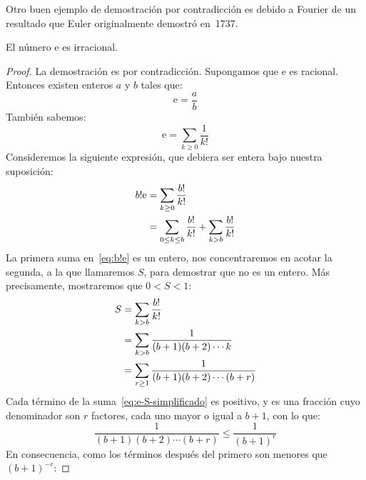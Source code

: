   Otro buen ejemplo de demostración por contradicción
  es debido a Fourier%
  de un resultado que
  Euler originalmente demostró en~1737.%
  \begin{theorem}
    \label{theo:e-irrational}
    El número \(\mathrm{e}\) es irracional.
  \end{theorem}
  \begin{proof}
    La demostración es por contradicción.%
    Supongamos que \(\mathrm{e}\) es racional.
    Entonces existen enteros \(a\) y \(b\)
    tales que:
    \begin{equation}
      \label{eq:e-rational}
      \mathrm{e} = \frac{a}{b}
    \end{equation}
    También sabemos:
    \begin{equation}
      \label{eq:e-valor}
      \mathrm{e} = \sum_{k \ge 0} \frac{1}{k!}
    \end{equation}
    Consideremos la siguiente expresión,
    que debiera ser entera bajo nuestra suposición:
    \begin{align}
      b! \mathrm{e}
	&= \sum_{k \ge 0} \frac{b!}{k!} \notag \\
	&= \sum_{0 \le k \le b} \frac{b!}{k!}
	     + \sum_{k > b} \frac{b!}{k!}
	\label{eq:b!e}
    \end{align}
    La primera suma en~\eqref{eq:b!e} es un entero,
    nos concentraremos en acotar la segunda,
    a la que llamaremos \(S\),
    para demostrar que no es un entero.
    Más precisamente,
    mostraremos que \(0 < S < 1\):
    \begin{align}
      S &= \sum_{k > b} \frac{b!}{k!} \notag \\
	&= \sum_{k > b} \frac{1}{(b + 1) (b + 2) \dotsm k} \notag \\
	&= \sum_{r \ge 1} \frac{1}{(b + 1) (b + 2) \dotsm (b + r)}
	\label{eq:e-S-simplificado}
    \end{align}
    Cada término de la suma~\eqref{eq:e-S-simplificado} es positivo,
    y es una fracción
    cuyo denominador son \(r\) factores,
    cada uno mayor o igual a \(b + 1\),
    con lo que:
    \begin{equation}
      \label{eq:e-S-cota-termino}
      \frac{1}{(b + 1) (b + 2) \dotsm (b + r)}
	\le \frac{1}{(b + 1)^r}
    \end{equation}
    En consecuencia,
    como los términos después del primero
    son menores que \((b + 1)^{-r}\):

\end{proof}
